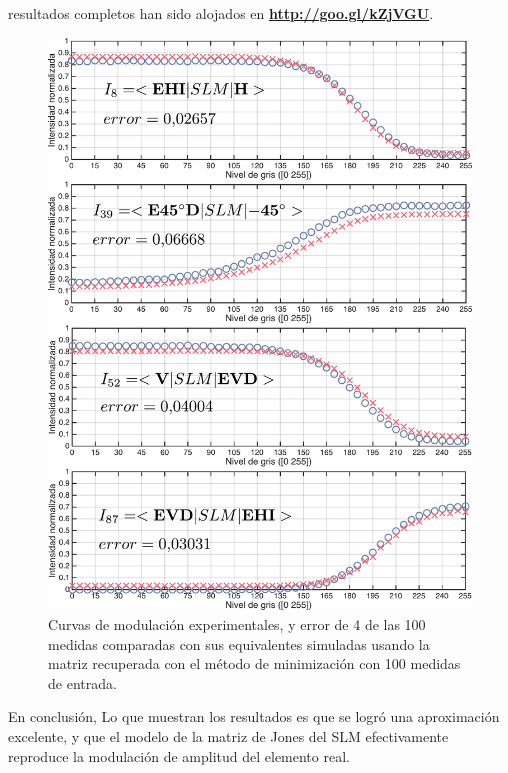 resultados completos han sido 
alojados en \href{http://goo.gl/kZjVGU}{\textbf{http://goo.gl/kZjVGU}}.
\begin{figure}[h!]
\centering
\includegraphics[scale=.5]{some_100_caracterization_results.pdf}
\caption[Curvas de modulación experimentales comparadas con las
simuladas usando el modelo obtenido con el método de minimización de 100
medidas]{Curvas de modulación
  experimentales, y error de 4 de las 100 medidas comparadas con sus
  equivalentes simuladas usando la matriz recuperada con el método de
  minimización con 100 medidas de entrada.}
\label{fig:100m_caracterization_results}
\end{figure}
En conclusión, Lo que muestran los resultados es que se logró una aproximación
excelente, y que el modelo de la matriz de Jones del SLM efectivamente
reproduce la modulación de amplitud del elemento real. 
